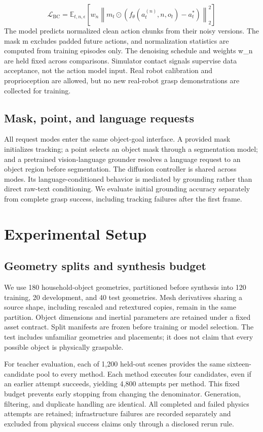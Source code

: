 \documentclass[letterpaper,10pt,conference]{ieeeconf}
\begin{document}
\begin{equation}
\mathcal{L}_{\mathrm{BC}}=\mathbb{E}_{t,n,\epsilon}\!\left[w_n\left\|m_t\odot\left(f_\theta(a_t^{(n)},n,o_t)-a_t^*\right)\right\|_2^2\right]
\label{eq:bc}
\end{equation}
The model predicts normalized clean action chunks from their noisy versions. The mask m excludes padded future actions, and normalization statistics are computed from training episodes only. The denoising schedule and weights w\_n are held fixed across comparisons. Simulator contact signals supervise data acceptance, not the action model input. Real robot calibration and proprioception are allowed, but no new real-robot grasp demonstrations are collected for training.

\subsection{Mask, point, and language requests}
All request modes enter the same object-goal interface. A provided mask initializes tracking; a point selects an object mask through a segmentation model; and a pretrained vision-language grounder resolves a language request to an object region before segmentation. The diffusion controller is shared across modes. Its language-conditioned behavior is mediated by grounding rather than direct raw-text conditioning. We evaluate initial grounding accuracy separately from complete grasp success, including tracking failures after the first frame.

\section{Experimental Setup}
\subsection{Geometry splits and synthesis budget}
We use 180 household-object geometries, partitioned before synthesis into 120 training, 20 development, and 40 test geometries. Mesh derivatives sharing a source shape, including rescaled and retextured copies, remain in the same partition. Object dimensions and inertial parameters are retained under a fixed asset contract. Split manifests are frozen before training or model selection. The test includes unfamiliar geometries and placements; it does not claim that every possible object is physically graspable.

For teacher evaluation, each of 1,200 held-out scenes provides the same sixteen-candidate pool to every method. Each method executes four candidates, even if an earlier attempt succeeds, yielding 4,800 attempts per method. This fixed budget prevents early stopping from changing the denominator. Generation, filtering, and duplicate handling are identical. All completed and failed physics attempts are retained; infrastructure failures are recorded separately and excluded from physical success claims only through a disclosed rerun rule.
\end{document}
